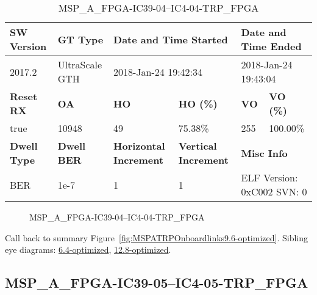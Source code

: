 \begin{table}[h]
\centering
\caption{MSP\_A\_FPGA-IC39-04--IC4-04-TRP\_FPGA}
\label{tab:MSPAFPGAIC3904IC404TRPFPGA9.6-optimized}
\begin{tabular}{@{}|l|l|l|l|l|l|@{}}
\toprule
\textbf{SW Version}                & \textbf{GT Type}   & \multicolumn{2}{l|}{\textbf{Date and Time Started}}            & \multicolumn{2}{l|}{\textbf{Date and Time Ended}}        \\ \midrule
2017.2                       & UltraScale GTH          & \multicolumn{2}{l|}{2018-Jan-24 19:42:34}                   & \multicolumn{2}{l|}{2018-Jan-24 19:43:04}               \\ \midrule
\textbf{Reset RX}                  & \textbf{OA} & \textbf{HO}   & \textbf{HO (\%)} & \textbf{VO} & \textbf{VO (\%)} \\ \midrule
true & 10948        & 49          & 75.38\%        & 255        & 100.00\%       \\ \midrule
\textbf{Dwell Type}                & \textbf{Dwell BER} & \textbf{Horizontal Increment} & \textbf{Vertical Increment}    & \multicolumn{2}{l|}{\textbf{Misc Info}}                  \\ \midrule
BER                            & 1e-7        & 1        & 1           & \multicolumn{2}{l|}{ELF Version: 0xC002 SVN: 0}                         \\ \bottomrule
\end{tabular}
\end{table}

\begin{figure}[h]
\caption{MSP\_A\_FPGA-IC39-04--IC4-04-TRP\_FPGA} \label{fig:MSPAFPGAIC3904IC404TRPFPGA9.6-optimized}
\end{figure}

Call back to summary Figure~\ref{fig:MSPATRPOnboardlinks9.6-optimized}.
Sibling eye diagrams: \hyperref[sec:MSPAFPGAIC3904IC404TRPFPGA6.4-optimized]{6.4-optimized}, \hyperref[sec:MSPAFPGAIC3904IC404TRPFPGA12.8-optimized]{12.8-optimized}.

\clearpage
\newpage


\subsection{MSP\_A\_FPGA-IC39-05--IC4-05-TRP\_FPGA}\label{sec:MSPAFPGAIC3905IC405TRPFPGA9.6-optimized}

